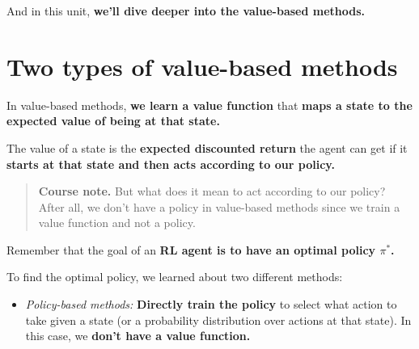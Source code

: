 \documentclass[11pt,a4paper]{article}
\begin{document}

And in this unit, \textbf{we'll dive deeper into the value-based methods.}

\section{Two types of value-based methods}\label{two-types-of-value-based-methods}

In value-based methods, \textbf{we learn a value function} that \textbf{maps a state to the expected value of being at that state.}


The value of a state is the \textbf{expected discounted return} the agent can get if it \textbf{starts at that state and then acts according to our policy.}

\begin{quote}
\textbf{Course note.} But what does it mean to act according to our policy? After all, we don't have a policy in value-based methods since we train a value function and not a policy.
\end{quote}

Remember that the goal of an \textbf{RL agent is to have an optimal policy \(\pi^*\).}

To find the optimal policy, we learned about two different methods:

\begin{itemize}
\tightlist
\item
  \emph{Policy-based methods:} \textbf{Directly train the policy} to select what action to take given a state (or a probability distribution over actions at that state). In this case, we \textbf{don't have a value function.}
\end{itemize}

\end{document}

